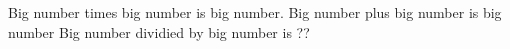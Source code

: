 Big number times big number is big number.
Big number plus big number is big number
Big number dividied by big number is ??
